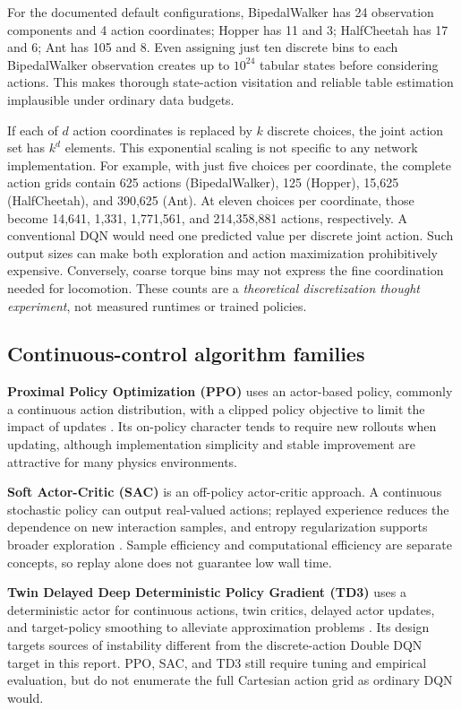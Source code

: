 \documentclass[a4paper,10pt,twocolumn]{article}
\begin{document}
For the documented default configurations, BipedalWalker has 24 observation components and 4 action coordinates; Hopper has 11 and 3; HalfCheetah has 17 and 6; Ant has 105 and 8. Even assigning just ten discrete bins to each BipedalWalker observation creates up to $10^{24}$ tabular states before considering actions. This makes thorough state-action visitation and reliable table estimation implausible under ordinary data budgets.

If each of $d$ action coordinates is replaced by $k$ discrete choices, the joint action set has $k^d$ elements. This exponential scaling is not specific to any network implementation. For example, with just five choices per coordinate, the complete action grids contain 625 actions (BipedalWalker), 125 (Hopper), 15,625 (HalfCheetah), and 390,625 (Ant). At eleven choices per coordinate, those become 14,641, 1,331, 1,771,561, and 214,358,881 actions, respectively. A conventional DQN would need one predicted value per discrete joint action. Such output sizes can make both exploration and action maximization prohibitively expensive. Conversely, coarse torque bins may not express the fine coordination needed for locomotion. These counts are a \emph{theoretical discretization thought experiment}, not measured runtimes or trained policies.

\subsection{Continuous-control algorithm families}
\textbf{Proximal Policy Optimization (PPO)} uses an actor-based policy, commonly a continuous action distribution, with a clipped policy objective to limit the impact of updates \cite{ppo2017}. Its on-policy character tends to require new rollouts when updating, although implementation simplicity and stable improvement are attractive for many physics environments.

\textbf{Soft Actor-Critic (SAC)} is an off-policy actor-critic approach. A continuous stochastic policy can output real-valued actions; replayed experience reduces the dependence on new interaction samples, and entropy regularization supports broader exploration \cite{sac2018}. Sample efficiency and computational efficiency are separate concepts, so replay alone does not guarantee low wall time.

\textbf{Twin Delayed Deep Deterministic Policy Gradient (TD3)} uses a deterministic actor for continuous actions, twin critics, delayed actor updates, and target-policy smoothing to alleviate approximation problems \cite{td32018}. Its design targets sources of instability different from the discrete-action Double DQN target in this report. PPO, SAC, and TD3 still require tuning and empirical evaluation, but do not enumerate the full Cartesian action grid as ordinary DQN would.
\end{document}
